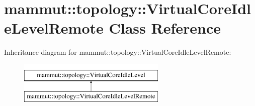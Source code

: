 \hypertarget{classmammut_1_1topology_1_1VirtualCoreIdleLevelRemote}{\section{mammut\-:\-:topology\-:\-:Virtual\-Core\-Idle\-Level\-Remote Class Reference}
\label{classmammut_1_1topology_1_1VirtualCoreIdleLevelRemote}
}
Inheritance diagram for mammut\-:\-:topology\-:\-:Virtual\-Core\-Idle\-Level\-Remote\-:\begin{figure}[H]
\begin{center}
\leavevmode
\includegraphics[height=2.000000cm]{classmammut_1_1topology_1_1VirtualCoreIdleLevelRemote}
\end{center}
\end{figure}
